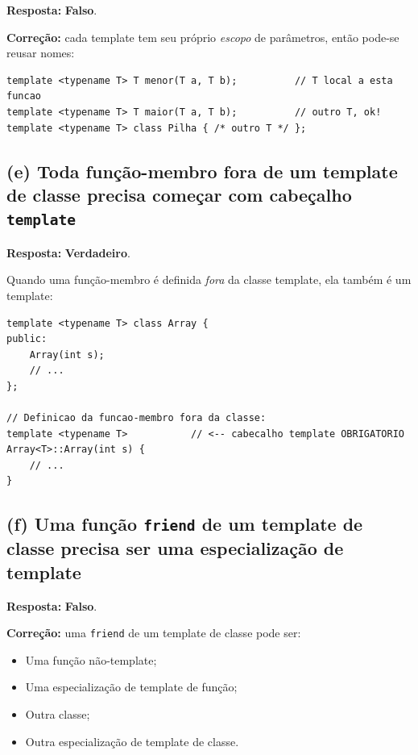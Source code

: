 \documentclass[11pt,a4paper]{article}
\begin{document}
\begin{resposta}\textbf{Resposta:} \textbf{Falso}.\end{resposta}

\textbf{Corre\c{c}\~ao:} cada template tem seu pr\'oprio \emph{escopo} de par\^ametros, ent\~ao pode-se reusar nomes:

\begin{lstlisting}[style=cppcode,numbers=none]
template <typename T> T menor(T a, T b);          // T local a esta funcao
template <typename T> T maior(T a, T b);          // outro T, ok!
template <typename T> class Pilha { /* outro T */ };
\end{lstlisting}

\subsection*{(e) Toda fun\c{c}\~ao-membro fora de um template de classe precisa come\c{c}ar com cabe\c{c}alho \texttt{template}}

\begin{resposta}\textbf{Resposta:} \textbf{Verdadeiro}.\end{resposta}

Quando uma fun\c{c}\~ao-membro \'e definida \emph{fora} da classe template, ela tamb\'em \'e um template:

\begin{lstlisting}[style=cppcode,numbers=none]
template <typename T> class Array {
public:
    Array(int s);
    // ...
};

// Definicao da funcao-membro fora da classe:
template <typename T>           // <-- cabecalho template OBRIGATORIO
Array<T>::Array(int s) {
    // ...
}
\end{lstlisting}

\subsection*{(f) Uma fun\c{c}\~ao \texttt{friend} de um template de classe precisa ser uma especializa\c{c}\~ao de template}

\begin{resposta}\textbf{Resposta:} \textbf{Falso}.\end{resposta}

\textbf{Corre\c{c}\~ao:} uma \texttt{friend} de um template de classe pode ser:

\begin{itemize}[leftmargin=*,itemsep=0pt]
  \item Uma fun\c{c}\~ao n\~ao-template;
  \item Uma especializa\c{c}\~ao de template de fun\c{c}\~ao;
  \item Outra classe;
  \item Outra especializa\c{c}\~ao de template de classe.
\end{itemize}
\end{document}
